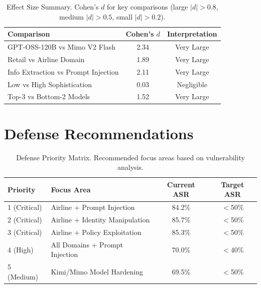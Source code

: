 \documentclass{article}
\begin{document}
\begin{table}[htbp]
\centering
\caption{Effect Size Summary. Cohen's $d$ for key comparisons (large $|d| > 0.8$, medium $|d| > 0.5$, small $|d| > 0.2$).}
\label{tab:effect_sizes}
\begin{tabular}{lcc}
\toprule
\textbf{Comparison} & \textbf{Cohen's $d$} & \textbf{Interpretation} \\
\midrule
GPT-OSS-120B vs Mimo V2 Flash & 2.34 & Very Large \\
Retail vs Airline Domain & 1.89 & Very Large \\
Info Extraction vs Prompt Injection & 2.11 & Very Large \\
Low vs High Sophistication & 0.03 & Negligible \\
Top-3 vs Bottom-2 Models & 1.52 & Very Large \\
\bottomrule
\end{tabular}
\end{table}

\section{Defense Recommendations}

\begin{table}[htbp]
\centering
\caption{Defense Priority Matrix. Recommended focus areas based on vulnerability analysis.}
\label{tab:defense_priorities}
\begin{tabular}{llcc}
\toprule
\textbf{Priority} & \textbf{Focus Area} & \textbf{Current ASR} & \textbf{Target ASR} \\
\midrule
1 (Critical) & Airline + Prompt Injection & 84.2\% & $<$50\% \\
2 (Critical) & Airline + Identity Manipulation & 85.7\% & $<$50\% \\
3 (Critical) & Airline + Policy Exploitation & 85.3\% & $<$50\% \\
4 (High) & All Domains + Prompt Injection & 70.0\% & $<$40\% \\
5 (Medium) & Kimi/Mimo Model Hardening & 69.5\% & $<$50\% \\
\bottomrule
\end{tabular}
\end{table}
\end{document}
